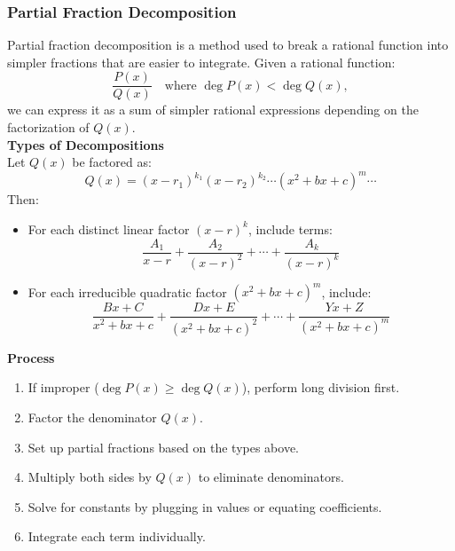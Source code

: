 \documentclass[11pt]{article}
\begin{document}
\subsubsection{Partial Fraction Decomposition}
Partial fraction decomposition is a method used to break a rational function into simpler fractions that are easier to integrate.
Given a rational function:
\[
    \frac{P(x)}{Q(x)} \quad \text{where } \deg P(x) < \deg Q(x),
\]
we can express it as a sum of simpler rational expressions depending on the factorization of $Q(x)$.\\[.5em]
\textbf{Types of Decompositions}\\[.5em]
\noindent
Let $Q(x)$ be factored as:
\[
    Q(x) = (x - r_1)^{k_1}(x - r_2)^{k_2}\cdots (x^2 + bx + c)^m\cdots
\]Then:
\begin{itemize}
    \item For each distinct linear factor $(x - r)^k$, include terms:
    \[
    \frac{A_1}{x - r} + \frac{A_2}{(x - r)^2} + \cdots + \frac{A_k}{(x - r)^k}
    \]
    
    \item For each irreducible quadratic factor $(x^2 + bx + c)^m$, include:
    \[
    \frac{Bx + C}{x^2 + bx + c} + \frac{Dx + E}{(x^2 + bx + c)^2} + \cdots + \frac{Yx + Z}{(x^2 + bx + c)^m}
    \]
\end{itemize}
\noindent
\textbf{Process}
\begin{enumerate}
    \item If improper ($\deg P(x) \geq \deg Q(x)$), perform long division first.
    \item Factor the denominator $Q(x)$.
    \item Set up partial fractions based on the types above.
    \item Multiply both sides by $Q(x)$ to eliminate denominators.
    \item Solve for constants by plugging in values or equating coefficients.
    \item Integrate each term individually.
\end{enumerate}
\end{document}
